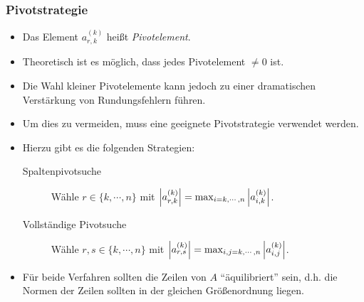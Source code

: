             \subsubsection{Pivotstrategie}
                \begin{itemize}
                	\item Das Element \( a_{r,k}^{(k)} \) heißt \textit{Pivotelement}.
                	\item Theoretisch ist es möglich, dass jedes Pivotelement \( \neq 0 \) ist.
                	\item Die Wahl kleiner Pivotelemente kann jedoch zu einer dramatischen Verstärkung von Rundungsfehlern führen.
                	\item Um dies zu vermeiden, muss eine geeignete Pivotstrategie verwendet werden.
                	\item Hierzu gibt es die folgenden Strategien:
	                	\begin{description}
	                		\item[Spaltenpivotsuche] Wähle \( r \in \{ k, \cdots, n \} \) mit \( \abs{a_{r,k}^{(k)}} = \max_{i = k, \cdots, n} \abs{a_{i,k}^{(k)}} \).
	                		\item[Vollständige Pivotsuche] Wähle \( r, s \in \{ k, \cdots, n \} \) mit \( \abs{a_{r,s}^{(k)}} = \max_{i, j = k, \cdots, n} \abs{a_{i,j}^{(k)}} \).
	                	\end{description}
                	\item Für beide Verfahren sollten die Zeilen von \(A\) \enquote{äquilibriert} sein, d.h. die Normen der Zeilen sollten in der gleichen Größenordnung liegen.
                \end{itemize}

